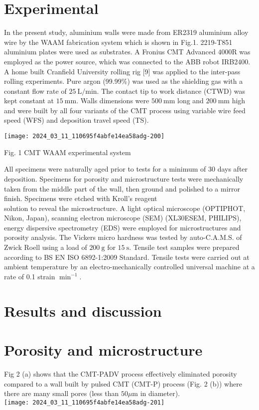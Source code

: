 \documentclass[10pt]{article}
\begin{document}
\section*{Experimental}
In the present study, aluminium walls were made from ER2319 aluminium alloy wire by the WAAM fabrication system which is shown in Fig.1. 2219-T851 aluminium plates were used as substrates. A Fronius CMT Advanced $4000 \mathrm{R}$ was employed as the power source, which was connected to the ABB robot IRB2400. A home built Cranfield University rolling rig [9] was applied to the inter-pass rolling experiments. Pure argon (99.99\%) was used as the shielding gas with a constant flow rate of $25 \mathrm{~L} / \mathrm{min}$. The contact tip to work distance (CTWD) was kept constant at $15 \mathrm{~mm}$. Walls dimensions were $500 \mathrm{~mm}$ long and $200 \mathrm{~mm}$ high and were built by all four variants of the CMT process using variable wire feed speed (WFS) and deposition travel speed (TS).

\begin{center}
\texttt{[image: 2024\_03\_11\_110695f4abfe14ea58adg-200]}
\end{center}

Fig. 1 CMT WAAM experimental system

All specimens were naturally aged prior to tests for a minimum of 30 days after deposition. Specimens for porosity and microstructure tests were mechanically taken from the middle part of the wall, then ground and polished to a mirror finish. Specimens were etched with Kroll's reagent\\
solution to reveal the microstructure. A light optical microscope (OPTIPHOT, Nikon, Japan), scanning electron microscope (SEM) (XL30ESEM, PHILIPS), energy dispersive spectrometry (EDS) were employed for microstructures and porosity analysis. The Vickers micro hardness was tested by auto-C.A.M.S. of Zwick Roell using a load of $200 \mathrm{~g}$ for $15 \mathrm{~s}$. Tensile test samples were prepared according to BS EN ISO 6892-1:2009 Standard. Tensile tests were carried out at ambient temperature by an electro-mechanically controlled universal machine at a rate of 0.1 strain $\min ^{-1}$.

\section*{Results and discussion}
\section*{Porosity and microstructure}
Fig 2 (a) shows that the CMT-PADV process effectively eliminated porosity compared to a wall built by pulsed CMT (CMT-P) process (Fig. 2 (b)) where there are many small pores (less than $50 \mu \mathrm{m}$ in diameter).\\
\texttt{[image: 2024\_03\_11\_110695f4abfe14ea58adg-201]}
\end{document}
